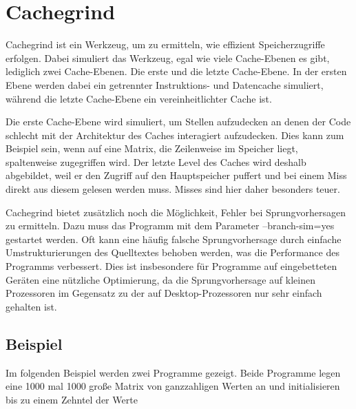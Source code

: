 \section{Cachegrind}
Cachegrind ist ein Werkzeug, um zu ermitteln, wie effizient Speicherzugriffe erfolgen. Dabei simuliert das Werkzeug, egal wie viele Cache-Ebenen es gibt, lediglich zwei Cache-Ebenen. Die erste und die letzte Cache-Ebene. In der ersten Ebene werden dabei ein getrennter Instruktions- und Datencache simuliert, während die letzte Cache-Ebene ein vereinheitlichter Cache ist.

Die erste Cache-Ebene wird simuliert, um Stellen aufzudecken an denen der Code schlecht mit der Architektur des Caches interagiert aufzudecken. Dies kann zum Beispiel sein, wenn auf eine Matrix, die Zeilenweise im Speicher liegt, spaltenweise zugegriffen wird. Der letzte Level des Caches wird deshalb abgebildet, weil er den Zugriff auf den Hauptspeicher puffert und bei einem Miss direkt aus diesem gelesen werden muss. Misses sind hier daher besonders teuer. 

Cachegrind bietet zusätzlich noch die Möglichkeit, Fehler bei Sprungvorhersagen zu ermitteln. Dazu muss das Programm mit dem Parameter --branch-sim=yes gestartet werden. Oft kann eine häufig falsche Sprungvorhersage durch einfache Umstrukturierungen des Quelltextes behoben werden, was die Performance des Programms verbessert. Dies ist insbesondere für Programme auf eingebetteten Geräten eine nützliche Optimierung, da die Sprungvorhersage auf kleinen Prozessoren im Gegensatz zu der auf Desktop-Prozessoren nur sehr einfach gehalten ist.

\subsection{Beispiel}
Im folgenden Beispiel werden zwei Programme gezeigt. Beide Programme legen eine 1000 mal 1000 große Matrix von ganzzahligen Werten an und initialisieren bis zu einem Zehntel der Werte